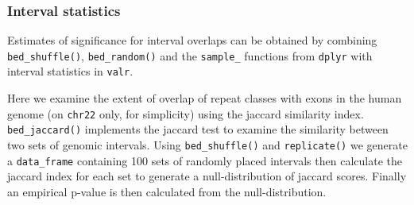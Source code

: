 \begin{Shaded}
\begin{Highlighting}[]
\end{Highlighting}
\end{Shaded}

\subsubsection{Interval statistics}\label{interval-statistics}

Estimates of significance for interval overlaps can be obtained by
combining \texttt{bed\_shuffle()}, \texttt{bed\_random()} and the
\texttt{sample\_} functions from \texttt{dplyr} with interval statistics
in \texttt{valr}.

Here we examine the extent of overlap of repeat classes with exons in
the human genome (on \texttt{chr22} only, for simplicity) using the
jaccard similarity index. \texttt{bed\_jaccard()} implements the jaccard
test to examine the similarity between two sets of genomic intervals.
Using \texttt{bed\_shuffle()} and \texttt{replicate()} we generate a
\texttt{data\_frame} containing 100 sets of randomly placed intervals
then calculate the jaccard index for each set to generate a
null-distribution of jaccard scores. Finally an empirical p-value is
then calculated from the null-distribution.

